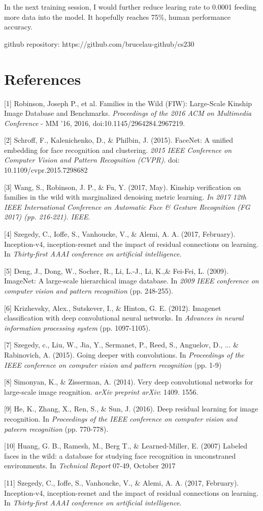 \documentclass{article}
\begin{document}
In the next training session, I would further reduce learing rate to 0.0001 feeding more data into the model. It hopefully reaches 75\%, human performance accuracy.

github repository: https://github.com/brucelau-github/cs230

\newpage
\section*{References}
\medskip
\small
[1] Robinson, Joseph P., et al. Families in the Wild (FIW): Large-Scale Kinship
Image Database and Benchmarks. {\it Proceedings of the 2016 ACM on Multimedia
Conference} - MM '16, 2016, doi:10.1145/2964284.2967219.

[2] Schroff, F., Kalenichenko, D., \& Philbin, J. (2015). FaceNet: A unified
embedding for face recognition and clustering. {\it 2015 IEEE Conference on
Computer Vision and Pattern Recognition (CVPR)}. doi: 10.1109/cvpr.2015.7298682

[3] Wang, S., Robinson, J. P., \& Fu, Y. (2017, May). Kinship verification on
families in the wild with marginalized denoising metric learning. {\it In 2017 12th
IEEE International Conference on Automatic Face \& Gesture Recognition (FG 2017)
(pp. 216-221). IEEE}.

[4] Szegedy, C., Ioffe, S., Vanhoucke, V., \& Alemi, A. A. (2017, February).
Inception-v4, inception-resnet and the impact of residual connections on
learning. In {\it Thirty-first AAAI conference on artificial intelligence}.

[5] Deng, J., Dong, W., Socher, R., Li, L.-J., Li, K.,\& Fei-Fei, L. (2009).
ImageNet: A large-scale hierarchical image database. In {\it 2009 IEEE
conference on computer vision and pattern recognition} (pp. 248-255).

[6] Krizhevsky, Alex., Sutskever, I., \& Hinton, G. E. (2012). Imagenet
classification with deep convolutional neural networks. In {\it Advances in
neural information processing system} (pp. 1097-1105).

[7] Szegedy, c., Liu, W., Jia, Y., Sermanet, P., Reed, S., Anguelov, D., ... \& Rabinovich, A. (2015). Going deeper with convolutions. In {\it Proceedings of the IEEE conference on computer vision and pattern recognition} (pp. 1-9)

[8] Simonyan, K., \& Zisserman, A. (2014). Very deep convolutional networks for large-scale image reognition. {\it arXiv preprint arXiv}: 1409. 1556.

[9] He, K., Zhang, X., Ren, S., \& Sun, J. (2016). Deep residual learning for image recognition. In {\it Proceedings of the IEEE conference on computer vision and pateern recognition} (pp. 770-778).

[10] Huang, G. B., Ramesh, M., Berg T., \& Learned-Miller, E. (2007) Labeled faces in the wild: a database for studying face recognition in unconstraned environments. In {\it Technical Report} 07-49, October 2017

[11] Szegedy, C., Ioffe, S., Vanhoucke, V., \& Alemi, A. A. (2017, February). Inception-v4, inception-resnet and the impact of residual connections on learning. In {\it Thirty-first AAAI conference on artificial intelligence}.
\end{document}

